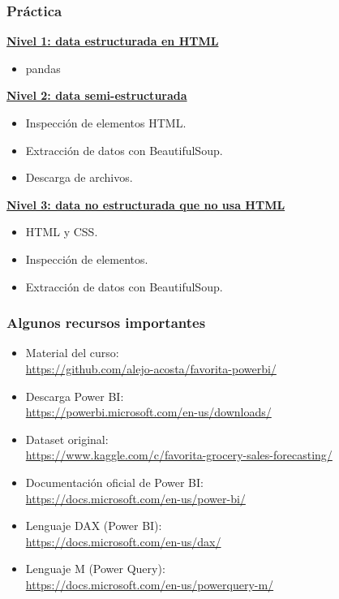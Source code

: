 \documentclass{beamer}
\begin{document}
\begin{frame}
	\frametitle{Práctica}
	\underline{\textbf{Nivel 1: data estructurada en HTML}}
	\begin{itemize}
		\item pandas
	\end{itemize}
	
	\underline{\textbf{Nivel 2: data semi-estructurada}}
	\begin{itemize}
		\item Inspección de elementos HTML.
		\item Extracción de datos con BeautifulSoup.
		\item Descarga de archivos.
	\end{itemize}

	\underline{\textbf{Nivel 3: data no estructurada que no usa HTML}}
	\begin{itemize}
		\item HTML y CSS.
		\item Inspección de elementos.
		\item Extracción de datos con BeautifulSoup.
	\end{itemize}
\end{frame}

\begin{frame}
	\frametitle{Algunos recursos importantes}
		\begin{itemize}
			\item Material del curso: \\
			\small{\url{https://github.com/alejo-acosta/favorita-powerbi/}}
			\item Descarga Power BI: \\
			\small{\url{https://powerbi.microsoft.com/en-us/downloads/}}
			\item Dataset original: \\
			\small{\url{https://www.kaggle.com/c/favorita-grocery-sales-forecasting/}}
			\item Documentación oficial de Power BI: \\
			\small{\url{https://docs.microsoft.com/en-us/power-bi/}}
			\item Lenguaje DAX (Power BI): \\
			\small{\url{https://docs.microsoft.com/en-us/dax/}}
			\item Lenguaje M (Power Query): \\
			\small{\url{https://docs.microsoft.com/en-us/powerquery-m/}}
		\end{itemize}
\end{frame}
\end{document}
